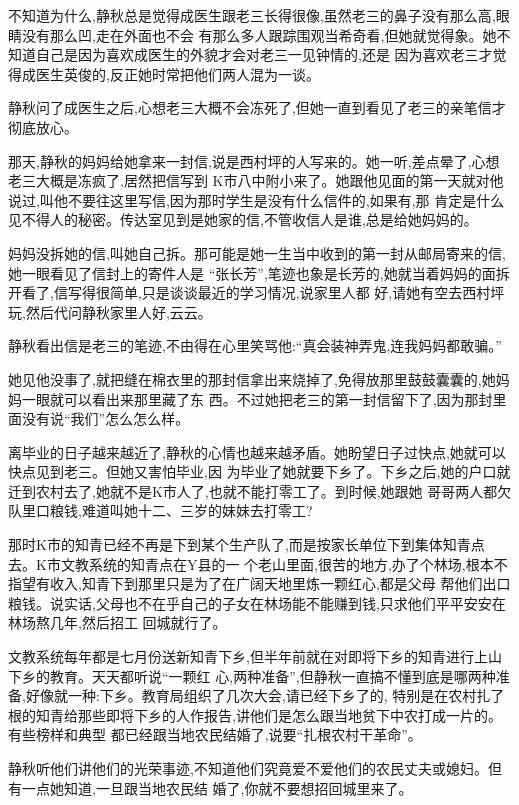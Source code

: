 ﻿\documentclass[12pt]{article}
\begin{document}
不知道为什么,静秋总是觉得成医生跟老三长得很像,虽然老三的鼻子没有那么高,眼睛没有那么凹,走在外面也不会
有那么多人跟踪围观当希奇看,但她就觉得象。她不知道自己是因为喜欢成医生的外貌才会对老三一见钟情的,还是
因为喜欢老三才觉得成医生英俊的,反正她时常把他们两人混为一谈。

静秋问了成医生之后,心想老三大概不会冻死了,但她一直到看见了老三的亲笔信才彻底放心。

那天,静秋的妈妈给她拿来一封信,说是西村坪的人写来的。她一听,差点晕了,心想老三大概是冻疯了,居然把信写到
K市八中附小来了。她跟他见面的第一天就对他说过,叫他不要往这里写信,因为那时学生是没有什么信件的,如果有,那
肯定是什么见不得人的秘密。传达室见到是她家的信,不管收信人是谁,总是给她妈妈的。

妈妈没拆她的信,叫她自己拆。那可能是她一生当中收到的第一封从邮局寄来的信,她一眼看见了信封上的寄件人是
``张长芳'',笔迹也象是长芳的,她就当着妈妈的面拆开看了,信写得很简单,只是谈谈最近的学习情况,说家里人都
好,请她有空去西村坪玩,然后代问静秋家里人好,云云。

静秋看出信是老三的笔迹,不由得在心里笑骂他:``真会装神弄鬼,连我妈妈都敢骗。''

她见他没事了,就把缝在棉衣里的那封信拿出来烧掉了,免得放那里鼓鼓囊囊的,她妈妈一眼就可以看出来那里藏了东
西。不过她把老三的第一封信留下了,因为那封里面没有说``我们''怎么怎么样。

离毕业的日子越来越近了,静秋的心情也越来越矛盾。她盼望日子过快点,她就可以快点见到老三。但她又害怕毕业,因
为毕业了她就要下乡了。下乡之后,她的户口就迁到农村去了,她就不是K市人了,也就不能打零工了。到时候,她跟她
哥哥两人都欠队里口粮钱,难道叫她十二、三岁的妹妹去打零工?

那时K市的知青已经不再是下到某个生产队了,而是按家长单位下到集体知青点去。K市文教系统的知青点在Y县的一
个老山里面,很苦的地方,办了个林场,根本不指望有收入,知青下到那里只是为了在广阔天地里炼一颗红心,都是父母
帮他们出口粮钱。说实话,父母也不在乎自己的子女在林场能不能赚到钱,只求他们平平安安在林场熬几年,然后招工
回城就行了。

文教系统每年都是七月份送新知青下乡,但半年前就在对即将下乡的知青进行上山下乡的教育。天天都听说``一颗红
心,两种准备'',但静秋一直搞不懂到底是哪两种准备,好像就一种:下乡。教育局组织了几次大会,请已经下乡了的,
特别是在农村扎了根的知青给那些即将下乡的人作报告,讲他们是怎么跟当地贫下中农打成一片的。有些榜样和典型
都已经跟当地农民结婚了,说要``扎根农村干革命''。

静秋听他们讲他们的光荣事迹,不知道他们究竟爱不爱他们的农民丈夫或媳妇。但有一点她知道,一旦跟当地农民结
婚了,你就不要想招回城里来了。
\end{document}
